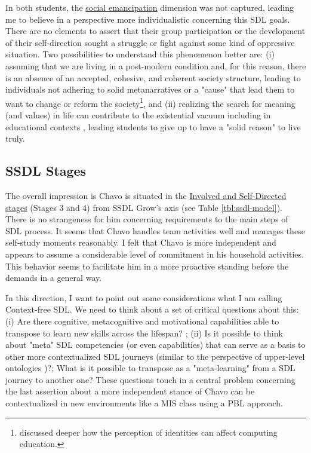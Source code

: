 In both students, the \underline{social emancipation} dimension was not captured, leading me to believe in a perspective more individualistic concerning this \gls{SDL} goals. There are no elements to assert that their group participation or the development of their self-direction sought a struggle or fight against some kind of oppressive situation. Two possibilities to understand this phenomenon better are: (i) assuming that we are living in a post-modern condition and, for this reason, there is an absence of an accepted, cohesive, and coherent society structure, leading to individuals not adhering to solid metanarratives or a "cause" that lead them to want to change or reform the society\footnote{ discussed deeper how the perception of identities can affect computing education.}, and (ii) realizing the search for meaning (and values) in life can contribute to the existential vacuum including in educational contexts \cite{csanli:2021}, leading students to give up to have a "solid reason" to live truly.

\subsection{SSDL Stages}
\label{disc-ss:staged-sdl}

The overall impression is Chavo is situated in the \underline{Involved and Self-Directed stages} (Stages 3 and 4) from \gls{SSDL} Grow's axis (see Table \ref{tbl:ssdl-model}). There is no strangeness for him concerning requirements to the main steps of \gls{SDL} process. It seems that Chavo handles team activities well and manages these self-study moments reasonably. I felt that Chavo is more independent and appears to assume a considerable level of commitment in his household activities. This behavior seems to facilitate him in a more proactive standing before the demands in a general way. 

In this direction, I want to point out some considerations what I am calling Context-free \gls{SDL}. We need to think about a set of  critical questions about this: (i) Are there cognitive,  metacognitive and motivational capabilities able to transpose to learn new skills across the lifespan? \cite{sheffler:2022}; (ii) Is it possible to think about "meta" \gls{SDL} competencies (or even capabilities) that can serve as a basis to other more contextualized \gls{SDL} journeys (similar to the perspective of upper-level ontologies \cite{niles:2001})?; What is it possible to transpose as a "meta-learning" from a \gls{SDL} journey to another one? These questions touch in a central problem concerning the last assertion about a more independent stance of Chavo can be contextualized in new environments like a \gls{MIS} class using a \gls{PBL} approach.

